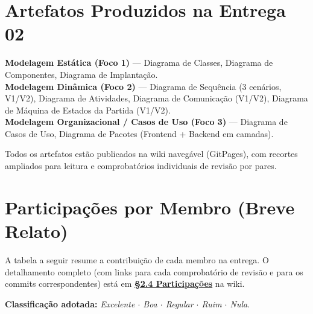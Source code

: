 \documentclass[11pt,a4paper]{article}
\begin{document}
\section{Artefatos Produzidos na Entrega 02}

\textbf{Modelagem Estática (Foco 1)} --- Diagrama de Classes, Diagrama de Componentes, Diagrama de Implantação. \\
\textbf{Modelagem Dinâmica (Foco 2)} --- Diagrama de Sequência (3 cenários, V1/V2), Diagrama de Atividades, Diagrama de Comunicação (V1/V2), Diagrama de Máquina de Estados da Partida (V1/V2). \\
\textbf{Modelagem Organizacional / Casos de Uso (Foco 3)} --- Diagrama de Casos de Uso, Diagrama de Pacotes (Frontend + Backend em camadas).

Todos os artefatos estão publicados na wiki navegável (GitPages), com recortes ampliados para leitura e comprobatórios individuais de revisão por pares.

\section{Participações por Membro (Breve Relato)}

A tabela a seguir resume a contribuição de cada membro na entrega. O detalhamento completo (com links para cada comprobatório de revisão e para os commits correspondentes) está em \textbf{\href{https://unbarqdsw2026-1-turma02.github.io/2026.01-T02_G6_Battle_Class_Entrega_2/\#/Modelagem/2.4.ParticipacoesModelagem}{§2.4 Participações}} na wiki.

\textbf{Classificação adotada:} \emph{Excelente $\cdot$ Boa $\cdot$ Regular $\cdot$ Ruim $\cdot$ Nula}.
\end{document}
